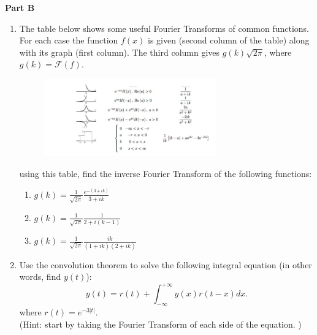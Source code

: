 \documentclass[fleqn]{article}
\begin{document}
  \textbf{Part B}
  \begin{enumerate}
    \item The table below shows some useful Fourier Transforms of common functions. For each case the function $f(x)$ is given (second column of the table) along with its graph (first column). The third column gives  $g(k) \sqrt{2 \pi}$, where $g(k)={ \mathcal F(f)}$. 
    \begin{figure}[h]
      \begin{center}
        \includegraphics[width=0.7\textwidth]{usefulTable.PNG}
      \end{center}
    \end{figure}

    using this table, find the inverse Fourier Transform  of the following functions:
    \begin{enumerate}
      \item $g(k) = \frac{1}{\sqrt{2\pi}} \frac{e^{-(3 + ik)}}{3 + ik}$

      \item $g(k)=\frac{1}{\sqrt{2\pi}}\frac{1}{2 + i(k-1)}$

      \item $g(k)=\frac{1}{\sqrt{2\pi}}\frac{ik}{(1+ik)(2 + ik)}$

    \end{enumerate}



    \item  Use the convolution theorem to solve the following integral equation (in other words, find $y(t)$): 
      $$
      y(t)=r(t) + \int_{-\infty}^{+\infty} y(x) r(t - x) dx. 
      $$
    where $r(t)=e^{-3|t|}$. \\
    (Hint: start by taking the Fourier Transform of each side of the equation. )
  \end{enumerate}
\end{document}
